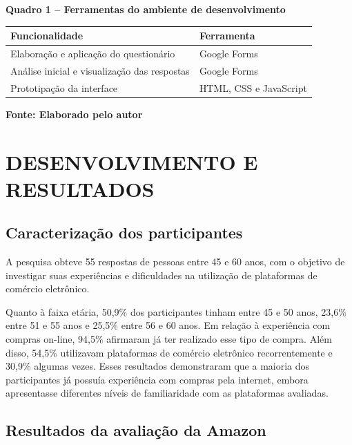 \documentclass[12pt,a4paper]{article}
\begin{document}
\begin{center}
\textbf{Quadro 1 -- Ferramentas do ambiente de desenvolvimento}
\end{center}
\begin{center}
\begin{tabular}{|p{7.8cm}|p{5.6cm}|}
\hline
\textbf{Funcionalidade} & \textbf{Ferramenta} \\
\hline
Elaboração e aplicação do questionário & Google Forms \\
\hline
Análise inicial e visualização das respostas & Google Forms \\
\hline
Prototipação da interface & HTML, CSS e JavaScript \\
\hline
\end{tabular}
\end{center}
\begin{center}
{\small\textbf{Fonte: Elaborado pelo autor}}
\end{center}

\section{DESENVOLVIMENTO E RESULTADOS}

\subsection{Caracterização dos participantes}

A pesquisa obteve 55 respostas de pessoas entre 45 e 60 anos, com o objetivo de investigar suas experiências e dificuldades na utilização de plataformas de comércio eletrônico.

Quanto à faixa etária, 50,9\% dos participantes tinham entre 45 e 50 anos, 23,6\% entre 51 e 55 anos e 25,5\% entre 56 e 60 anos. Em relação à experiência com compras on-line, 94,5\% afirmaram já ter realizado esse tipo de compra. Além disso, 54,5\% utilizavam plataformas de comércio eletrônico recorrentemente e 30,9\% algumas vezes. Esses resultados demonstraram que a maioria dos participantes já possuía experiência com compras pela internet, embora apresentasse diferentes níveis de familiaridade com as plataformas avaliadas.

\subsection{Resultados da avaliação da Amazon}
\end{document}
